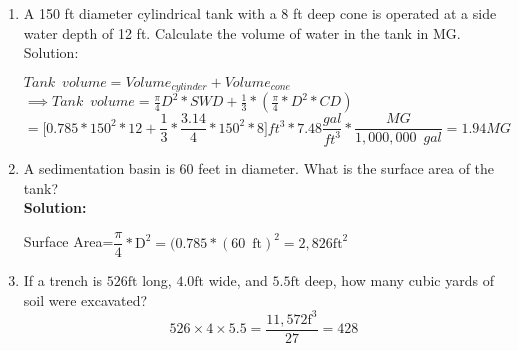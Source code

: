 \documentclass{article}
\begin{document}
\begin{enumerate}
\item A 150 ft diameter cylindrical tank with a 8 ft deep cone is operated at a side water depth of 12 ft.  Calculate the volume of water in the tank in MG.\\
Solution:\\
\begin{center}
\end{center}
$Tank \enspace volume=Volume_{cylinder}+Volume_{cone}$\\
\vspace{0.3cm}
$\implies Tank \enspace volume=\frac{\pi}{4}D^2*SWD+\frac{1}{3}*(\frac{\pi}{4}*D^2*CD)$\\
\vspace{0.3cm}
$=\Big[0.785*150^2*12+\dfrac{1}{3}*\dfrac{3.14}{4}*150^2*8\Big]ft^3*7.48\dfrac{gal}{ft^3}*\dfrac{MG}{1,000,000 \enspace gal}=\boxed{1.94MG}$\\


\item A sedimentation basin is 60 feet in diameter. What is the surface area of the tank?\\

 

\textbf{Solution:}

\vspace{0.2cm}

Surface Area=$\dfrac{\pi}{4}*\mathrm{D}^2=(0.785*(60 \enspace \mathrm{ft})^2 =\boxed{2,826 \mathrm{ft}^2}$

\item If a trench is $526 \mathrm{ft}$ long, $4.0 \mathrm{ft}$ wide, and $5.5 \mathrm{ft}$ deep, how many cubic yards of soil were excavated?\\
$$526 \times 4 \times 5.5=\frac{11,572 \mathrm{f}^{3}}{27}=428$$\\


\end{enumerate}
\end{document}
